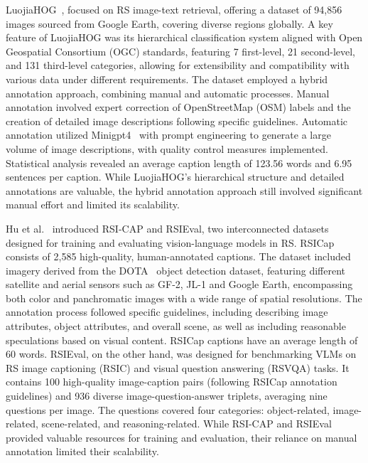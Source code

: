 LuojiaHOG~\cite{zhao2024luojiahog}, focused on RS image-text retrieval, offering a dataset of 94,856 images sourced from Google Earth, covering diverse regions globally. A key feature of LuojiaHOG was its hierarchical classification system aligned with Open Geospatial Consortium (OGC) standards, featuring 7 first-level, 21 second-level, and 131 third-level categories, allowing for extensibility and compatibility with various data under different requirements. The dataset employed a hybrid annotation approach, combining manual and automatic processes. Manual annotation involved expert correction of OpenStreetMap (OSM) labels and the creation of detailed image descriptions following specific guidelines. Automatic annotation utilized Minigpt4~\cite{zhu2023minigpt} with prompt engineering to generate a large volume of image descriptions, with quality control measures implemented. Statistical analysis revealed an average caption length of 123.56 words and 6.95 sentences per caption. While LuojiaHOG's hierarchical structure and detailed annotations are valuable, the hybrid annotation approach still involved significant manual effort and limited its scalability.

Hu et al.~\cite{hu2023rsgpt} introduced RSI-CAP and RSIEval, two interconnected datasets designed for training and evaluating vision-language models in RS. RSICap consists of 2,585 high-quality, human-annotated captions. The dataset included imagery derived from the DOTA~\cite{xia2018dota} object detection dataset, featuring different satellite and aerial sensors such as GF-2, JL-1 and Google Earth, encompassing both color and panchromatic images with a wide range of spatial resolutions. The annotation process followed specific guidelines, including describing image attributes, object attributes, and overall scene, as well as including reasonable speculations based on visual content. RSICap captions have an average length of 60 words. RSIEval, on the other hand, was designed for benchmarking VLMs on RS image captioning (RSIC) and visual question answering (RSVQA) tasks. It contains 100 high-quality image-caption pairs (following RSICap annotation guidelines) and 936 diverse image-question-answer triplets, averaging nine questions per image. The questions covered four categories: object-related, image-related, scene-related, and reasoning-related. While RSI-CAP and RSIEval provided valuable resources for training and evaluation, their reliance on manual annotation limited their scalability.

